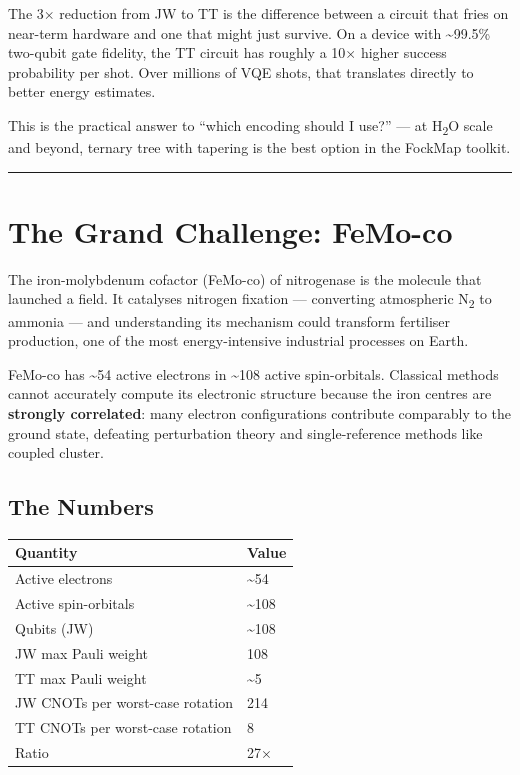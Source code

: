\documentclass[
  11pt,
  oneside]{book}
\begin{document}
The 3$\times$ reduction from JW to TT is the difference between a circuit that
fries on near-term hardware and one that might just survive. On a device
with \textasciitilde99.5\% two-qubit gate fidelity, the TT circuit has
roughly a 10$\times$ higher success probability per shot. Over millions of VQE
shots, that translates directly to better energy estimates.

This is the practical answer to ``which encoding should I use?'' --- at
H\textsubscript{2}O scale and beyond, ternary tree with tapering is the best option in
the FockMap toolkit.

\begin{center}\rule{0.5\linewidth}{0.5pt}\end{center}

\section{The Grand Challenge:
FeMo-co}\label{the-grand-challenge-femo-co}

The iron-molybdenum cofactor (FeMo-co) of nitrogenase is the molecule
that launched a field. It catalyses nitrogen fixation --- converting
atmospheric N\textsubscript{2} to ammonia --- and understanding its mechanism could
transform fertiliser production, one of the most energy-intensive
industrial processes on Earth.

FeMo-co has \textasciitilde54 active electrons in \textasciitilde108
active spin-orbitals. Classical methods cannot accurately compute its
electronic structure because the iron centres are \textbf{strongly
correlated}: many electron configurations contribute comparably to the
ground state, defeating perturbation theory and single-reference methods
like coupled cluster.

\subsection{The Numbers}\label{the-numbers-1}

\begin{longtable}[]{@{}ll@{}}
\toprule\noalign{}
Quantity & Value \\
\midrule\noalign{}
\endhead
\bottomrule\noalign{}
\endlastfoot
Active electrons & \textasciitilde54 \\
Active spin-orbitals & \textasciitilde108 \\
Qubits (JW) & \textasciitilde108 \\
JW max Pauli weight & 108 \\
TT max Pauli weight & \textasciitilde5 \\
JW CNOTs per worst-case rotation & 214 \\
TT CNOTs per worst-case rotation & 8 \\
Ratio & 27$\times$ \\
\end{longtable}
\end{document}
